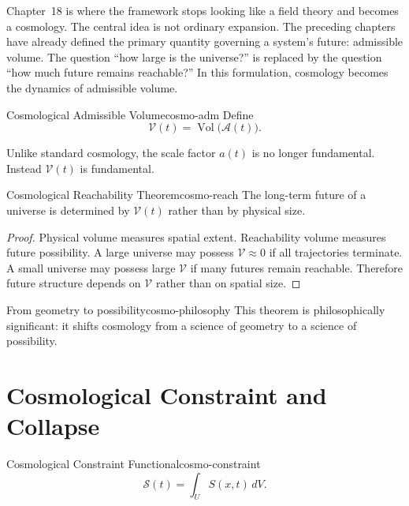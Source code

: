 \documentclass[12pt,twoside,openright]{book}
\newcommand{\Vol}{\operatorname{Vol}}
\begin{document}
Chapter~18 is where the framework stops looking like a
field theory and becomes a cosmology. The central idea is
not ordinary expansion. The preceding chapters have already
defined the primary quantity governing a system's future:
admissible volume. The question ``how large is the
universe?'' is replaced by the question ``how much future
remains reachable?'' In this formulation, cosmology becomes
the dynamics of admissible volume.

\begin{definition}{Cosmological Admissible Volume}{cosmo-adm}
  Define
  \[
    \mathcal{V}(t) = \Vol\bigl(\mathcal{A}(t)\bigr).
  \]
\end{definition}

Unlike standard cosmology, the scale factor $a(t)$ is no
longer fundamental. Instead $\mathcal{V}(t)$ is fundamental.

\begin{theorem}{Cosmological Reachability Theorem}{cosmo-reach}
  The long-term future of a universe is determined by
  $\mathcal{V}(t)$ rather than by physical size.
\end{theorem}

\begin{proof}
  Physical volume measures spatial extent. Reachability
  volume measures future possibility. A large universe may
  possess $\mathcal{V} \approx 0$ if all trajectories
  terminate. A small universe may possess large
  $\mathcal{V}$ if many futures remain reachable. Therefore
  future structure depends on $\mathcal{V}$ rather than on
  spatial size.
\end{proof}

\begin{remark}{From geometry to possibility}{cosmo-philosophy}
  This theorem is philosophically significant: it shifts
  cosmology from a science of geometry to a science of
  possibility.
\end{remark}

\section{Cosmological Constraint and Collapse}
\label{sec:ch18-collapse}

\begin{definition}{Cosmological Constraint Functional}{cosmo-constraint}
  \[
    \mathcal{S}(t) = \int_U S(x,t)\, dV.
  \]
\end{definition}
\end{document}
